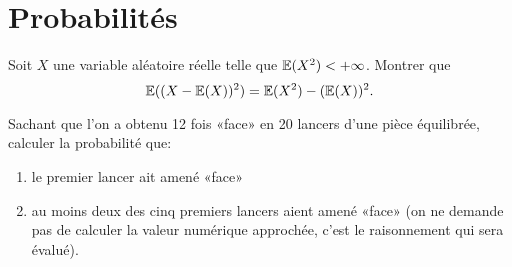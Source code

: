 \documentclass{tp_um}
\begin{document}





\section{Probabilités}

\exo{}Soit $X$ une variable aléatoire réelle telle que $\mathbb{E}(X^2) < +\infty$. Montrer que 
\[
	\mathbb{E}( (X-\mathbb{E}(X))^2) = \mathbb{E}(X^2) - (\mathbb{E}(X))^2.
\]

\exo{}Sachant que l'on a obtenu 12 fois «face» en 20 lancers d'une pièce équilibrée, calculer la probabilité que:
\begin{enumerate}
	\item le premier lancer ait amené «face»
	\item au moins deux des cinq premiers lancers aient amené «face» (on ne demande pas de calculer la valeur numérique approchée, c'est le raisonnement qui sera évalué).
\end{enumerate}%

\end{document}
